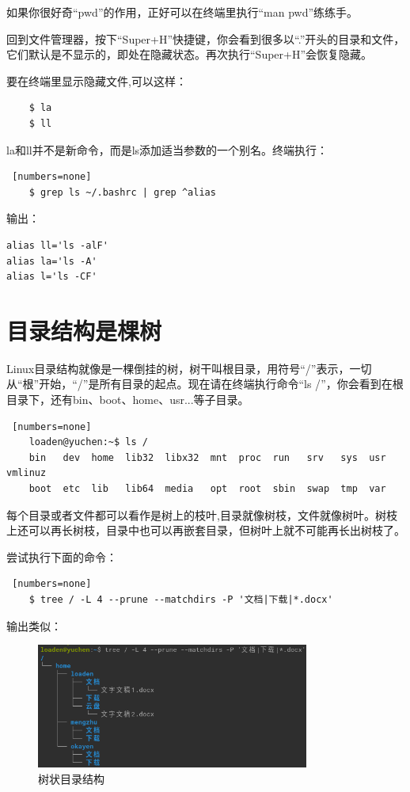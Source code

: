 \par 如果你很好奇“pwd”的作用，正好可以在终端里执行“man pwd”练练手。
\par 回到文件管理器，按下“Super+H”快捷键，你会看到很多以“.”开头的目录和文件，它们默认是不显示的，即处在隐藏状态。再次执行“Super+H”会恢复隐藏。

\par 要在终端里显示隐藏文件,可以这样：
\begin{lstlisting}
    $ la
    $ ll
\end{lstlisting}

\par la和ll并不是新命令，而是ls添加适当参数的一个别名。终端执行：
\begin{lstlisting} [numbers=none]
    $ grep ls ~/.bashrc | grep ^alias
\end{lstlisting}
\par 输出：
\begin{lstlisting}
alias ll='ls -alF'
alias la='ls -A'
alias l='ls -CF'
\end{lstlisting}


\section{目录结构是棵树}

\par Linux目录结构就像是一棵倒挂的树，树干叫根目录，用符号“/”表示，一切从“根”开始，“/”是所有目录的起点。现在请在终端执行命令“{ls\hspace{0.3em} /}”，你会看到在根目录下，还有bin、boot、home、usr...等子目录。
\begin{lstlisting} [numbers=none]
    loaden@yuchen:~$ ls /
    bin   dev  home  lib32  libx32  mnt  proc  run   srv   sys  usr  vmlinuz
    boot  etc  lib   lib64  media   opt  root  sbin  swap  tmp  var
\end{lstlisting}

\par 每个目录或者文件都可以看作是树上的枝叶,目录就像树枝，文件就像树叶。树枝上还可以再长树枝，目录中也可以再嵌套目录，但树叶上就不可能再长出树枝了。
\par 尝试执行下面的命令：

\begin{lstlisting} [numbers=none]
    $ tree / -L 4 --prune --matchdirs -P '文档|下载|*.docx'
\end{lstlisting}
\par 输出类似：
\begin{figure} [htbp]
	\centering
	\includegraphics [width=0.8\textwidth]{images/ch01/2021-10-31_16-05-54.png}
	\caption{树状目录结构}
	\label{fig:2021-10-31_16-05-54}
\end{figure}

